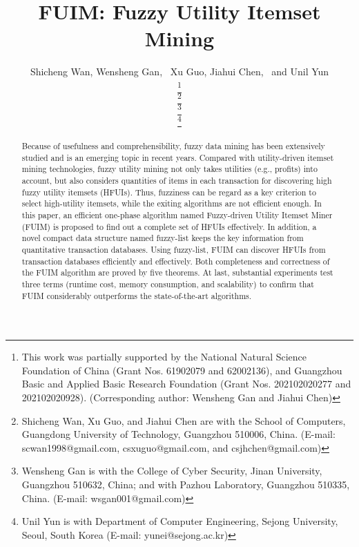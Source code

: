 \documentclass[journal]{IEEEtran}
\begin{document}

\title{FUIM: Fuzzy Utility Itemset Mining}



\author{Shicheng Wan, Wensheng Gan,~ Xu Guo, Jiahui Chen,~ and Unil Yun
	

\thanks{This work was partially supported by the National Natural Science Foundation of China (Grant Nos. 61902079 and 62002136), and Guangzhou Basic and Applied Basic Research Foundation (Grant Nos. 202102020277  and 202102020928). (Corresponding author: Wensheng Gan and Jiahui Chen)}
	
	\thanks{Shicheng Wan, Xu Guo, and Jiahui Chen  are with the School of Computers, Guangdong University of Technology, Guangzhou 510006, China. (E-mail: scwan1998@gmail.com, csxuguo@gmail.com, and csjhchen@gmail.com)} 
		
	\thanks{Wensheng Gan is with the College of Cyber Security, Jinan University, Guangzhou 510632, China; and with Pazhou Laboratory, Guangzhou 510335, China. (E-mail: wsgan001@gmail.com)}	
	
	\thanks{Unil Yun is with Department of Computer Engineering, Sejong University, Seoul, South Korea (E-mail: yunei@sejong.ac.kr)}
	

}




\maketitle

\begin{abstract}

	Because of usefulness and comprehensibility, fuzzy data mining has been extensively studied and is an emerging topic in recent years. Compared with  utility-driven itemset mining technologies, fuzzy utility mining not only takes utilities (e.g., profits) into account, but also considers quantities of items in each transaction for discovering high fuzzy utility itemsets (HFUIs). Thus, fuzziness can be regard as a key criterion to select high-utility itemsets, while the exiting algorithms are not efficient enough. In this paper, an efficient one-phase algorithm named Fuzzy-driven Utility Itemset Miner (FUIM) is proposed to find out a complete set of HFUIs effectively. In addition, a novel compact data structure named fuzzy-list keeps the key information from quantitative transaction databases. Using fuzzy-list, FUIM can discover HFUIs from transaction databases efficiently and effectively. Both completeness and correctness of the FUIM algorithm are proved by five theorems. At last, substantial experiments test three terms (runtime cost, memory consumption, and scalability) to confirm that FUIM considerably outperforms the state-of-the-art algorithms.
\end{abstract}
\end{document}
